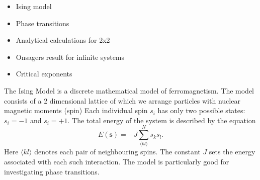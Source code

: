 \begin{itemize}
\item Ising model
\item Phase transitions
\item Analytical calculations for 2x2
\item Onsagers result for infinite systems
\item Critical exponents
\end{itemize}
The Ising Model is a discrete mathematical model of ferromagnetism. The model consists of a 2 dimensional lattice of which we arrange particles with nuclear magnetic moments (spin) Each individual spin $s_i$ has only two possible states: $s_i=-1$ and $s_i=+1$. The total energy of the system is described by the equation
\begin{equation}
    E(\mathbf{s})=-J \sum_{\langle k l\rangle}^N s_k s_l.
\end{equation}
Here $\langle k l\rangle$ denotes each pair of neighbouring spins. The constant $J$ sets the energy associated with each such interaction. The model is particularly good for investigating phase transitions.